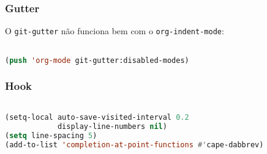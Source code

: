 \documentclass[11pt]{article}
\begin{document}
\subsubsection{Gutter}
\label{sec:gutter}
O \texttt{git-gutter} não funciona bem com o \texttt{org-indent-mode}:

\begin{lstlisting}[language=Lisp]%! Someone please complete this list for me

(push 'org-mode git-gutter:disabled-modes)
\end{lstlisting}

\subsubsection{Hook}
\label{sec:hook}
\begin{lstlisting}[language=Lisp]%! Someone please complete this list for me

(setq-local auto-save-visited-interval 0.2
            display-line-numbers nil)
(setq line-spacing 5)
(add-to-list 'completion-at-point-functions #'cape-dabbrev)
\end{lstlisting}
\end{document}
